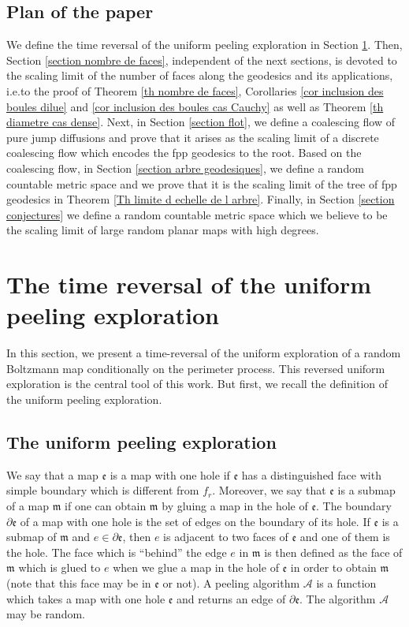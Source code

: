 \documentclass[11pt]{article}
\numberwithin{equation}{section}
\begin{document}
\subsection{Plan of the paper}
We define the time reversal of the uniform peeling exploration in Section \ref{section renversement de l'exploration}. Then, Section \ref{section nombre de faces}, independent of the next sections, is devoted to the scaling limit of the number of faces along the geodesics and its applications, i.e.\@ to the proof of Theorem \ref{th nombre de faces}, Corollaries \ref{cor inclusion des boules dilue} and \ref{cor inclusion des boules cas Cauchy} {as well as} Theorem \ref{th diametre cas dense}. Next, in Section \ref{section flot}, we define a coalescing flow of pure jump diffusions and prove that it arises as the scaling limit of a discrete coalescing flow which encodes the fpp geodesics to the root. Based on the coalescing flow, in Section \ref{section arbre geodesiques}, we define a random countable metric space and we prove that it is the scaling limit of the tree of fpp geodesics in Theorem \ref{Th limite d echelle de l arbre}. Finally, in Section \ref{section conjectures} we define a random countable metric space which we believe to be the scaling limit of large random planar maps with high degrees.


\section{The time reversal of the uniform peeling exploration}\label{section renversement de l'exploration}

In this section, we present a time-reversal of the uniform exploration of a random Boltzmann map conditionally on the perimeter process. This reversed uniform exploration is the central tool of this work. But first, we recall the definition of the uniform peeling exploration.

\subsection{The uniform peeling exploration}\label{sous-section explo uniforme}

We say that a map $\mathfrak{e}$ is a map with one hole if $\mathfrak{e}$ has a distinguished face with simple boundary which is different from $f_r$. Moreover, we say that $\mathfrak{e}$ is a submap of a map $\mathfrak{m} $ if one can obtain $\mathfrak{m}$ by gluing a map in the hole of $\mathfrak{e}$. The boundary $\partial \mathfrak{e}$ of a map with one hole is the set of edges on the boundary of its hole. {If $\mathfrak{e}$ is a submap of $\mathfrak{m}$ and $e \in \partial \mathfrak{e}$, then $e$ is adjacent to two faces of $\mathfrak{e}$ and one of them is the hole. The face which is ``behind'' the edge $e$ in $\mathfrak{m}$ is then defined as the face of $\mathfrak{m}$ which is glued to $e$ when we glue a map in the hole of $\mathfrak{e}$ in order to obtain $\mathfrak{m}$  (note that this face may be in $\mathfrak{e}$ or not).} A peeling algorithm $\mathcal{A}$ is a function which takes a map with one hole $\mathfrak{e}$ and returns an edge of $\partial \mathfrak{e}$. The algorithm $\mathcal{A}$ may be random.
\end{document}
